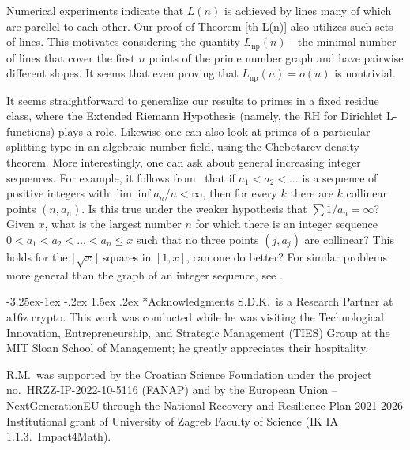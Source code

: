 \documentclass[10pt]{article}
\makeatletter
\renewcommand\subsection{\@startsection{subsection}{2}{\z@}
{-3.25ex\@plus -1ex \@minus -.2ex}
{1.5ex \@plus .2ex}
{\normalfont\normalsize\bfseries\boldmath}}
\theoremstyle{definition}
\theoremstyle{remark}
\numberwithin{equation}{section}
\makeatother
\begin{document}
Numerical experiments indicate that $L(n)$ is achieved by lines many of which are parellel to each other.
Our proof of Theorem \ref{th-L(n)} also utilizes such sets of lines.
This motivates considering the quantity $L_\mathrm{np}(n)$---the minimal number of lines that cover the first $n$ points of the prime number graph and have pairwise different slopes.
It seems that even proving that $L_\mathrm{np}(n) = o(n)$ is nontrivial.

It seems straightforward to generalize our results to primes in a fixed residue class, where the
Extended Riemann Hypothesis (namely, the RH for Dirichlet L-functions) plays a role.  Likewise
one can also look at primes of a particular splitting type in an algebraic number field, using
the Chebotarev density theorem.
More interestingly,
one can ask about general increasing integer sequences.
For example, it
follows from~\cite{P2} that if $a_1<a_2<\dots$ is a sequence of positive integers
with $\lim\inf a_n/n<\infty$, then for every $k$ there are $k$ collinear points $(n,a_n)$.
Is this true under the weaker hypothesis that $\sum 1/a_n=\infty$?   Given $x$, what is the largest
number $n$ for which there is an integer sequence $0<a_1<a_2<\dots<a_n\le x$ such that no
three points $(j,a_j)$ are collinear?  This holds for the $\lfloor\sqrt{x}\rfloor$ squares in $[1,x]$,
can one do better?
For similar problems more general than the graph of an
integer sequence, see \cite{B}.

\subsection*{Acknowledgments}
S.D.K.\ is a Research Partner at a16z crypto. This work was conducted while he was visiting the
Technological Innovation, Entrepreneurship, and Strategic Management (TIES)
Group at the MIT Sloan School of Management; he greatly appreciates their hospitality.

R.M.\ was supported by the Croatian Science Foundation under the project no.\ HRZZ-IP-2022-10-5116 (FANAP) and by the European Union -- NextGenerationEU through the National Recovery and Resilience Plan 2021-2026 Institutional grant of University of Zagreb Faculty of Science (IK IA 1.1.3.\ Impact4Math).
\end{document}
